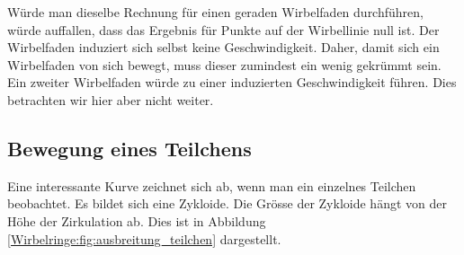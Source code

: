 Würde man dieselbe Rechnung für einen geraden Wirbelfaden durchführen, würde auffallen, dass das Ergebnis für Punkte auf der Wirbellinie null ist.
Der Wirbelfaden induziert sich selbst keine Geschwindigkeit.
Daher, damit sich ein Wirbelfaden von sich bewegt, muss dieser zumindest ein wenig gekrümmt sein.
Ein zweiter Wirbelfaden würde zu einer induzierten Geschwindigkeit führen. 
Dies betrachten wir hier aber nicht weiter. 

\subsection{Bewegung eines Teilchens}



Eine interessante Kurve zeichnet sich ab, wenn man ein einzelnes Teilchen beobachtet.
Es bildet sich eine Zykloide.
Die Grösse der Zykloide hängt von der Höhe der Zirkulation ab.
Dies ist in Abbildung \ref{Wirbelringe:fig:ausbreitung_teilchen} dargestellt.
